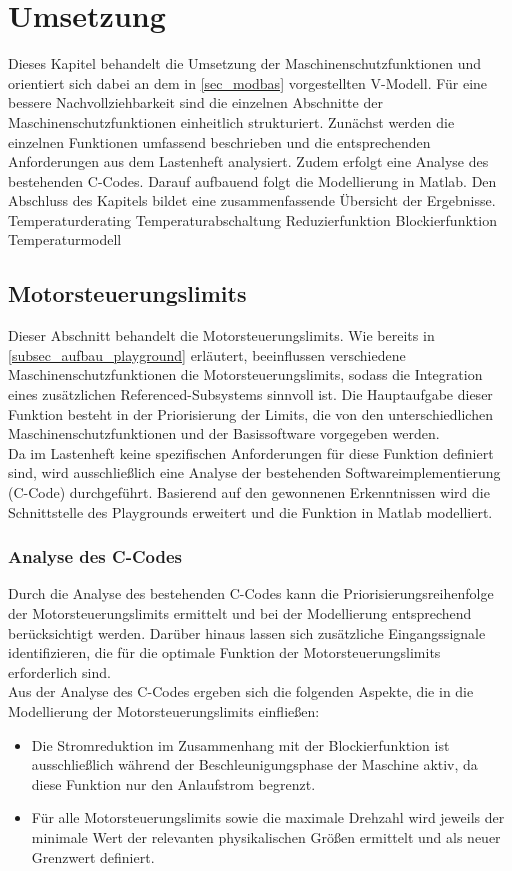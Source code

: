 \chapter{Umsetzung}
\label{ch_umsetzung}
Dieses Kapitel behandelt die Umsetzung der Maschinenschutzfunktionen und orientiert sich dabei an dem in \autoref{sec_modbas} vorgestellten V-Modell. Für eine bessere Nachvollziehbarkeit sind die einzelnen Abschnitte der Maschinenschutzfunktionen einheitlich strukturiert. Zunächst werden die einzelnen Funktionen umfassend beschrieben und die entsprechenden Anforderungen aus dem Lastenheft analysiert. Zudem erfolgt eine Analyse des bestehenden C-Codes. Darauf aufbauend folgt die Modellierung in Matlab. Den Abschluss des Kapitels bildet eine zusammenfassende Übersicht der Ergebnisse. 
{Temperaturderating}
{Temperaturabschaltung}
{Reduzierfunktion}
{Blockierfunktion}
{Temperaturmodell}
\section{Motorsteuerungslimits}
Dieser Abschnitt behandelt die Motorsteuerungslimits. Wie bereits in \autoref{subsec_aufbau_playground} erläutert, beeinflussen verschiedene Maschinenschutzfunktionen die Motorsteuerungslimits, sodass die Integration eines zusätzlichen Referenced-Subsystems sinnvoll ist. Die Hauptaufgabe dieser Funktion besteht in der Priorisierung der Limits, die von den unterschiedlichen Maschinenschutzfunktionen und der Basissoftware vorgegeben werden.\\
Da im Lastenheft keine spezifischen Anforderungen für diese Funktion definiert sind, wird ausschließlich eine Analyse der bestehenden Softwareimplementierung (C-Code) durchgeführt. Basierend auf den gewonnenen Erkenntnissen wird die Schnittstelle des Playgrounds erweitert und die Funktion in Matlab modelliert.

\subsection{Analyse des C-Codes}
Durch die Analyse des bestehenden C-Codes kann die Priorisierungsreihenfolge der Motorsteuerungslimits ermittelt und bei der Modellierung entsprechend berücksichtigt werden. Darüber hinaus lassen sich zusätzliche Eingangssignale identifizieren, die für die optimale Funktion der Motorsteuerungslimits erforderlich sind.\\
Aus der Analyse des C-Codes \cite{Firmware_gesamt} ergeben sich die folgenden Aspekte, die in die Modellierung der Motorsteuerungslimits einfließen:
\begin{itemize}
\item Die Stromreduktion im Zusammenhang mit der Blockierfunktion ist ausschließlich während der Beschleunigungsphase der Maschine aktiv, da diese Funktion nur den Anlaufstrom begrenzt.
\item Für alle Motorsteuerungslimits sowie die maximale Drehzahl wird jeweils der minimale Wert der relevanten physikalischen Größen ermittelt und als neuer Grenzwert definiert.
\end{itemize}

